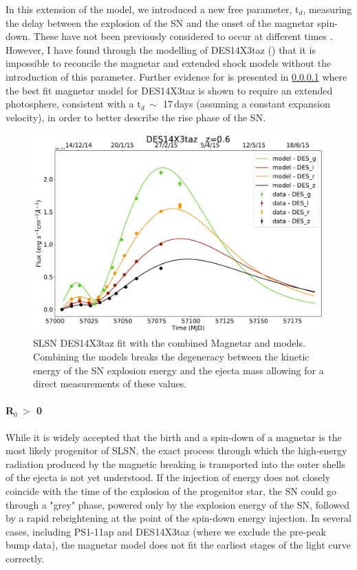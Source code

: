 In this extension of the model, we introduced a new free parameter, t$_d$, measuring the delay between the explosion of the SN and the onset of the magnetar spin-down. These have not been previously considered to occur at different times \citep{Nicoll2016}. However, I have found through the modelling of DES14X3taz () that it is impossible to reconcile the magnetar and extended shock models without the introduction of this parameter. Further evidence for is presented in \cref{par:R0nonzero} where the best fit magnetar model for DES14X3taz is shown to require an extended photosphere, consistent with a t$_d ~\sim$ 17\,days (assuming a constant expansion velocity), in order to better describe the rise phase of the SN.

\begin{figure}
  \centering
  \includegraphics[width=\textwidth]{Figures/Chapter4/DES14X3taz}
  \caption{SLSN DES14X3taz fit with the combined Magnetar and \citet{Piro2015} models. Combining the models breaks the degeneracy between the kinetic energy of the SN explosion energy and the ejecta mass allowing for a direct measurements of these values.}
  \label{fig:PiroMagnetar}
\end{figure}

\paragraph{R$_0~>$ 0}
\label{par:R0nonzero}
While it is widely accepted that the birth and a spin-down of a magnetar is the most likely progenitor of SLSN, the exact process through which the high-energy radiation produced by the magnetic breaking is transported into the outer shells of the ejecta is not yet understood. If the injection of energy does not closely coincide with the time of the explosion of the progenitor star, the SN could go through a "grey" phase, powered only by the explosion energy of the SN, followed by a rapid rebrightening at the point of the spin-down energy injection. In several cases, including PS1-11ap and DES14X3taz (where we exclude the pre-peak bump data), the magnetar model does not fit the earliest stages of the light curve correctly.

